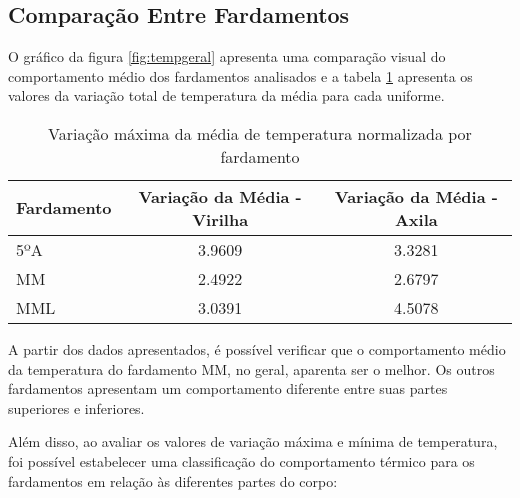    \subsection{Comparação Entre Fardamentos}
        O gráfico da figura \ref{fig:tempgeral} apresenta uma comparação visual do comportamento médio dos 
        fardamentos analisados e a tabela \ref{tab:maxmedia} apresenta os valores da variação total de 
        temperatura da média para cada uniforme.


        \begin{table}[H]
            \centering
            \caption{Variação máxima da média de temperatura normalizada por fardamento}
            \begin{tabular}{lcc}
            \hline
            Fardamento & Variação da Média - Virilha & Variação da Média - Axila \\
            \hline
            5ºA & 3.9609 & 3.3281 \\ 
            MM & 2.4922 & 2.6797 \\ 
            MML & 3.0391 & 4.5078 \\ 
            \hline
            \end{tabular}
            
            \label{tab:maxmedia}
            \end{table}

        A partir dos dados apresentados, é possível verificar que o comportamento médio da temperatura 
        do fardamento \acrshort{MM}, no geral, aparenta ser o melhor. Os outros fardamentos 
        apresentam um comportamento diferente entre suas partes superiores e inferiores.

        Além disso, ao avaliar os valores de variação máxima e mínima de temperatura, foi possível estabelecer 
        uma classificação do comportamento térmico para os fardamentos em relação às diferentes partes do corpo:       

